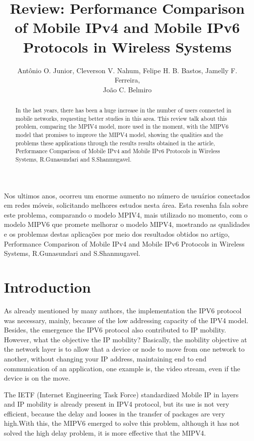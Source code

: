 \documentclass[12pt]{article}
\title{Review: Performance Comparison of Mobile IPv4 and Mobile IPv6 Protocols in Wireless Systems}
\author{Antônio O. Junior\inst{1}, Cleverson V. Nahum\inst{1}, Felipe H. B. Bastos\inst{1}, Jamelly F. Ferreira\inst{1}, \\João C. Belmiro\inst{1} }
\begin{document}
 

\maketitle

\begin{abstract}
  In the last years, there has been a huge increase in the number of users connected in mobile networks, requesting better studies in this area. This review talk about this problem, comparing the MPIV4 model, more used in the
  moment, with the MIPV6 model that promises to improve the MIPV4 model, showing the qualities and the problems these   applications through the results results obtained in the article, Performance Comparison of Mobile IPv4 and
  Mobile IPv6 Protocols in Wireless Systems, R.Gunasundari and S.Shanmugavel.
\end{abstract}     
\begin{resumo} 
  Nos ultimos anos, ocorreu um enorme aumento no número de usuários conectados em redes móveis, solicitando melhores estudos nesta área. Esta resenha fala sobre este problema, comparando o modelo MPIV4, mais utilizado no momento, com o modelo MIPV6 que promete melhorar o modelo MIPV4, mostrando as qualidades e os problemas destas aplicações por meio dos resultados obtidos no artigo, Performance Comparison of Mobile IPv4 and Mobile IPv6 Protocols in Wireless Systems, R.Gunasundari and S.Shanmugavel.
\end{resumo}


\section{Introduction}

As already mentioned by many authors, the implementation the IPV6 protocol was necessary, mainly, because of the low addressing capacity of the IPV4 model.  Besides, the emergence the IPV6 protocol also contributed to IP mobility. However, what the objective the IP mobility? Basically, the mobility objective at the network layer is to allow that a device or node to move from one network to another, without changing your IP address, maintaining end to end communication of an application, one example is, the video stream, even if the device is on the move. 

The IETF (Internet Engineering Task Force) standardized Mobile IP in layers and IP mobility is already present in IPV4 protocol, but its use is not very efficient, because the delay and looses in the transfer of packages are very high.With this, the MIPV6 emerged to solve this problem, although it has not solved the high delay problem, it is more
effective that the MIPV4.
\end{document}
